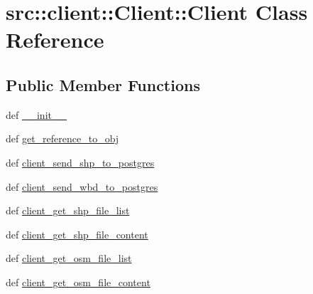 \hypertarget{classsrc_1_1client_1_1Client_1_1Client}{
\section{src::client::Client::Client Class Reference}
\label{classsrc_1_1client_1_1Client_1_1Client}
}
\subsection*{Public Member Functions}
\begin{DoxyCompactItemize}
\item 
def \hyperlink{classsrc_1_1client_1_1Client_1_1Client_a646bf16bd36fe17146a913bb9b739c6d}{\_\-\_\-init\_\-\_\-}
\item 
def \hyperlink{classsrc_1_1client_1_1Client_1_1Client_a67d86b5dae13a77b7b9254d9945d1928}{get\_\-reference\_\-to\_\-obj}
\item 
def \hyperlink{classsrc_1_1client_1_1Client_1_1Client_ae7e99818087a1dad8bdac1ae5984d878}{client\_\-send\_\-shp\_\-to\_\-postgres}
\item 
def \hyperlink{classsrc_1_1client_1_1Client_1_1Client_a81a9adc6a52a89f210fdb8d4aa65ea9d}{client\_\-send\_\-wbd\_\-to\_\-postgres}
\item 
def \hyperlink{classsrc_1_1client_1_1Client_1_1Client_abaa61a1c95afdd49f337c42e53a124eb}{client\_\-get\_\-shp\_\-file\_\-list}
\item 
def \hyperlink{classsrc_1_1client_1_1Client_1_1Client_a0cf4d0ebe99c56c3b868d6c1b1c0d9b8}{client\_\-get\_\-shp\_\-file\_\-content}
\item 
def \hyperlink{classsrc_1_1client_1_1Client_1_1Client_a034e75b4d258f1390f2c1a0d71f05897}{client\_\-get\_\-osm\_\-file\_\-list}
\item 
def \hyperlink{classsrc_1_1client_1_1Client_1_1Client_a4c2affde5545a76be35dce61a0afd7e5}{client\_\-get\_\-osm\_\-file\_\-content}
\end{DoxyCompactItemize}

